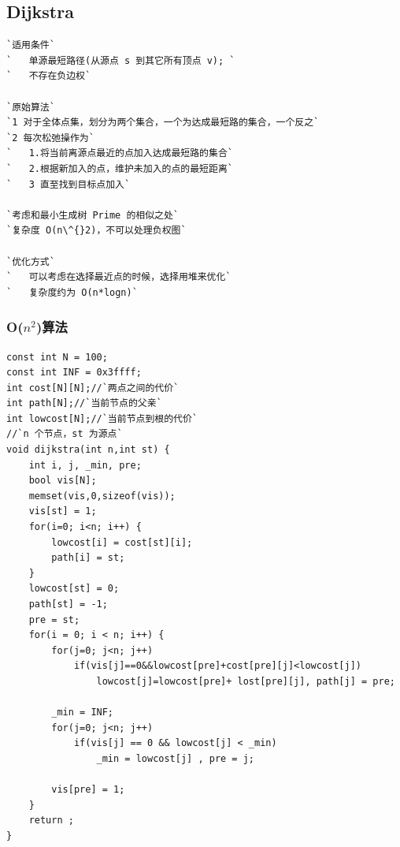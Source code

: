 \documentclass[a4paper]{article}
\begin{document}
\begin{CJK*}{UTF8}{gbsn}
\begin{multicols}{3}
\begin{flushleft}
\subsection{Dijkstra}
\begin{lstlisting}
`适用条件`
`	单源最短路径(从源点 s 到其它所有顶点 v); `
`	不存在负边权`

`原始算法`
`1 对于全体点集，划分为两个集合，一个为达成最短路的集合，一个反之`
`2 每次松弛操作为`
`	1.将当前离源点最近的点加入达成最短路的集合`
`	2.根据新加入的点，维护未加入的点的最短距离`
`	3 直至找到目标点加入`

`考虑和最小生成树 Prime 的相似之处`
`复杂度 O(n\^{}2)，不可以处理负权图`

`优化方式`
`	可以考虑在选择最近点的时候，选择用堆来优化`
`	复杂度约为 O(n*logn)`

\end{lstlisting}

\subsubsection{O($n^2$)算法}
\begin{lstlisting}
const int N = 100;
const int INF = 0x3ffff;
int cost[N][N];//`两点之间的代价`
int path[N];//`当前节点的父亲`
int lowcost[N];//`当前节点到根的代价`
//`n 个节点，st 为源点`
void dijkstra(int n,int st) {
    int i, j, _min, pre;
    bool vis[N];
    memset(vis,0,sizeof(vis));
    vis[st] = 1;
    for(i=0; i<n; i++) {
        lowcost[i] = cost[st][i];
        path[i] = st;
    }
    lowcost[st] = 0;
    path[st] = -1;
    pre = st;
    for(i = 0; i < n; i++) {
        for(j=0; j<n; j++)
            if(vis[j]==0&&lowcost[pre]+cost[pre][j]<lowcost[j])
                lowcost[j]=lowcost[pre]+ lost[pre][j], path[j] = pre;
 
        _min = INF;
        for(j=0; j<n; j++)
            if(vis[j] == 0 && lowcost[j] < _min)
                _min = lowcost[j] , pre = j;
 
        vis[pre] = 1;
    }
    return ;
}
\end{lstlisting}


\end{flushleft}
\end{multicols}
\end{CJK*}
\end{document}
